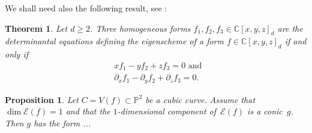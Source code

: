 \documentclass[a4paper, 11pt, reqno]{amsart}
\theoremstyle{plain}
\newtheorem{prop}[lemma]{Proposition}
\newtheorem{theorem}[lemma]{Theorem}
\theoremstyle{definition}
\newcommand{\C}{\mathbb{C}}
\newcommand{\p}{\mathbb{P}}
\newcommand{\Eig}[1]{\mathcal{E}\!\left( {#1} \right)}
\begin{document}
We shall need also the following result, see \cite[Theorem 3.11]{BGV}:
\begin{theorem}\label{thm: defining equations}Let $d\ge 2$. Three homogeneous forms $f_1,f_2,f_3\in \C[x,y,z]_d$ are the determinantal equations defining the eigenscheme of a form $f\in\C[x,y,z]_d$ if and only if 
	\begin{align}
	    &xf_1 - y f_2 + z f_3 = 0\label{eq: second}\mbox{ and }\\
	&\partial_x f_1 - \partial_y f_2 + \partial_z f_3 = 0 \label{eq: first}.
	\end{align}
\end{theorem}

\begin{prop}
    Let $C = V(f) \subset \p^2$ be a cubic curve.
Assume that $\dim \Eig{f} = 1$ and that the $1$-dimensional component of~$\Eig{f}$ is a conic~$g$. Then $g$ has the form ...
\end{prop}
\end{document}
